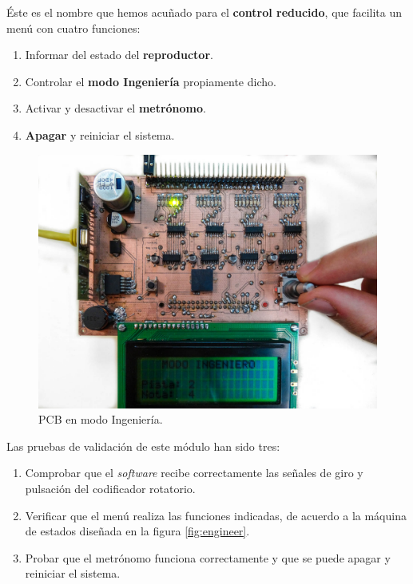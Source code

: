 Éste es el nombre que hemos acuñado para el \textbf{control reducido}, que facilita un menú con cuatro funciones:

\begin{enumerate}
	\item Informar del estado del \textbf{reproductor}.
	\item Controlar el \textbf{modo Ingeniería} propiamente dicho.
	\item Activar y desactivar el \textbf{metrónomo}.
	\item \textbf{Apagar} y reiniciar el sistema.
\end{enumerate}

\smallskip

\begin{figure}[H]
	\noindent \begin{centering}
		\includegraphics[width=\linewidth*2/3]{capitulo6/pcb_ingeniero}
		\par\end{centering}
	\smallskip
	\caption{\label{fig:pcb_ingeniero} PCB en modo Ingeniería.}
\end{figure} 

\smallskip

Las pruebas de validación de este módulo han sido tres:

\begin{enumerate}
	\item Comprobar que el \textit{software} recibe correctamente las señales de giro y pulsación del codificador rotatorio.
	
	\item Verificar que el menú realiza las funciones indicadas, de acuerdo a la máquina de estados diseñada en la figura \ref{fig:engineer}.
	
	\item Probar que el metrónomo funciona correctamente y que se puede apagar y reiniciar el sistema.
\end{enumerate}

